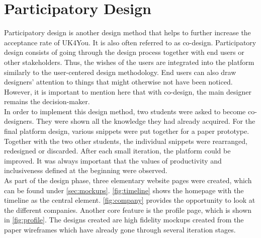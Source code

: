 \section{Participatory Design}
Participatory design is another design method that helps to further increase the acceptance rate of UK4You\cite{participatory-design-spinuzzi}.
It is also often referred to as co-design. 
Participatory design consists of going through the design process together with end users or other stakeholders.
Thus, the wishes of the users are integrated into the platform similarly to the user-centered design methodology.
End users can also draw designers' attention to things that might otherwise not have been noticed.
However, it is important to mention here that with co-design, the main designer remains the decision-maker.\\

In order to implement this design method, two students were asked to become co-designers.
They were shown all the knowledge they had already acquired.
For the final platform design, various snippets were put together for a paper prototype.
Together with the two other students, the individual snippets were rearranged, redesigned or discarded.
After each small iteration, the platform could be improved.
It was always important that the values of productivity and inclusiveness defined at the beginning were observed.\\

As part of the design phase, three elementary website pages were created, which can be found under \autoref{sec:mockups}.
\autoref{fig:timeline} shows the homepage with the timeline as the central element. 
\autoref{fig:company} provides the opportunity to look at the different companies.
Another core feature is the profile page, which is shown in \autoref{fig:profile}.
The designs created are high fidelity mockups created from the paper wireframes which have already gone through several iteration stages.

